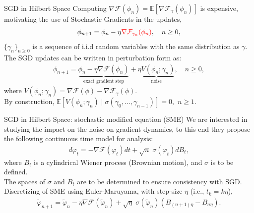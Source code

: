 \documentclass[dvipsnames, handout]{beamer}
\newcommand{\1}{\mathds{1}}	%
\begin{document}
\begin{frame}{SGD in Hilbert Space}
    Computing $\nabla \mathcal{F}(\phi_n) = \mathbb{E}[\nabla \mathcal{F}_{\gamma}(\phi_n)]$ is expensive, motivating the use of Stochastic Gradients in the updates,
    \begin{align*}
        \phi_{n+1} = \phi_n - \eta \textcolor{red}{\nabla \mathcal{F}_{\gamma_n}(\phi_n)}, \quad n\geq 0,
    \end{align*}
    $\{\gamma_n\}_{n \geq 0}$ is a sequence of i.i.d random variables with the same distribution as $\gamma$. The SGD updates can be written in perturbation form as:
    \begin{align}
        \phi_{n+1} = \underbrace{\phi_n - \eta \nabla \mathcal{F}(\phi_n)}_{\text{exact gradient step}} + \underbrace{\eta V(\phi_n; \gamma_n)}_{\text{noise}}, \quad n\geq 0,
    \end{align}
    where $V(\phi_n; \gamma_n) = \nabla \mathcal{F}(\phi) - \nabla \mathcal{F}_{\gamma}(\phi)$.\\
    By construction, $\mathbb{E}[V(\phi_n; \gamma_n) \;| \; \sigma(\gamma_0, \ldots, \gamma_{n-1})] = 0,$ $n \geq 1$.
\end{frame}

\begin{frame}{SGD in Hilbert Space: stochastic modified equation (SME)}
    We are interested in studying the impact on the noise on gradient dynamics, to this end they propose the following continuous time model for analysis:
    \begin{align}
        d\varphi_t = -\nabla \mathcal{F}(\varphi_t)dt + \sqrt{n} \;\sigma(\varphi_t) dB_t,
    \end{align}
    where $B_t$ is a cylindrical Wiener process (Brownian motion), and $\sigma$ is to be defined.\\
    The spaces of $\sigma$ and $B_t$ are to be determined to ensure consistency with SGD. Discretizing of SME using Euler-Maruyama, with step-size $\eta$ (i.e., $t_k = k\eta$),
    \begin{align}
        \tilde{\varphi}_{n+1} = \tilde{\varphi}_n - \eta \nabla \mathcal{F}(\tilde{\varphi}_n) + \sqrt{\eta} \; \sigma(\tilde{\varphi}_n)( B_{(n+1)\eta} - B_{n \eta}).
    \end{align}
\end{frame}
\end{document}
